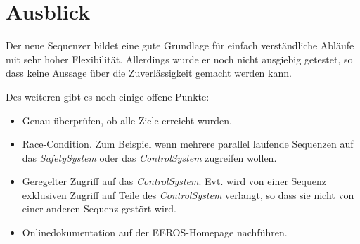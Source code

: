 \section{Ausblick}
Der neue Sequenzer bildet eine gute Grundlage für einfach verständliche Abläufe mit sehr hoher Flexibilität.
Allerdings wurde er noch nicht ausgiebig getestet, so dass keine Aussage über die Zuverlässigkeit gemacht werden kann.

Des weiteren gibt es noch einige offene Punkte:
\begin{itemize}
\item Genau überprüfen, ob alle Ziele erreicht wurden.
\item Race-Condition. Zum Beispiel wenn mehrere parallel laufende Sequenzen auf das \textit{SafetySystem} oder das \textit{ControlSystem} zugreifen wollen.
\item Geregelter Zugriff auf das \textit{ControlSystem}. Evt. wird von einer Sequenz exklusiven Zugriff auf Teile des \textit{ControlSystem} verlangt, so dass sie nicht von einer anderen Sequenz gestört wird.
\item Onlinedokumentation auf der EEROS-Homepage nachführen.
\end{itemize}
